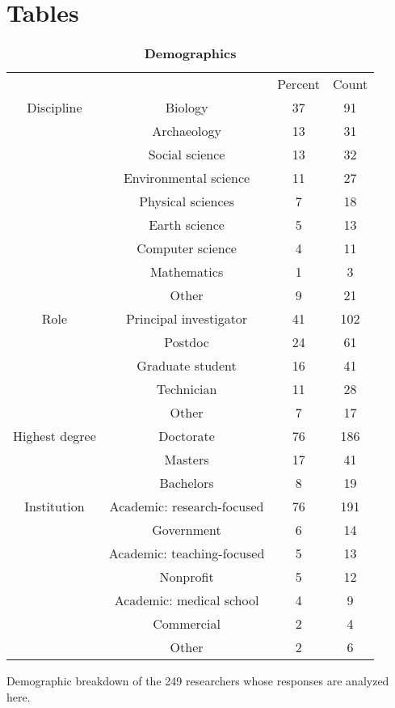 \documentclass[10pt]{article}
\begin{document}
\section*{Tables}
\begin{table}[!ht]
\caption{
\bf{Demographics}}
\begin{tabular}{|c|c|c|c|}

 &  & Percent & Count \\
Discipline & Biology & 37 & 91 \\
 & Archaeology & 13 & 31 \\
 & Social science & 13 & 32 \\
 & Environmental science & 11 & 27 \\
 & Physical sciences & 7 & 18 \\
 & Earth science & 5 & 13 \\
 & Computer science & 4 & 11 \\
 & Mathematics & 1 & 3 \\
 & Other & 9 & 21 \\
Role & Principal investigator & 41 & 102 \\
 & Postdoc & 24 & 61 \\
 & Graduate student & 16 & 41 \\
 & Technician & 11 & 28 \\
 & Other & 7 & 17 \\
Highest degree & Doctorate & 76 & 186 \\
 & Masters & 17 & 41 \\
 & Bachelors & 8 & 19 \\
Institution & Academic: research-focused  & 76 & 191 \\
 & Government  & 6 & 14 \\
 & Academic: teaching-focused   & 5 & 13 \\
 & Nonprofit  & 5 & 12 \\
 & Academic: medical school   & 4 & 9 \\
 & Commercial  & 2 & 4 \\
 & Other  & 2 & 6 \\

\end{tabular}
\begin{flushleft}Demographic breakdown of the 249 researchers whose responses are analyzed here.
\end{flushleft}
\label{tab:demographics}
 \end{table}
\end{document}

